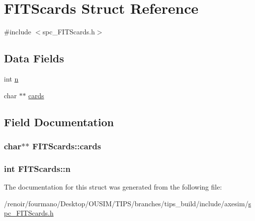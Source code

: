 \hypertarget{structFITScards}{
\section{FITScards Struct Reference}
\label{structFITScards}
}


{\ttfamily \#include $<$spc\_\-FITScards.h$>$}\subsection*{Data Fields}
\begin{DoxyCompactItemize}
\item 
int \hyperlink{structFITScards_ae541232523495d8487f2d47d2ad71873}{n}
\item 
char $\ast$$\ast$ \hyperlink{structFITScards_ad1be9be894e41dec8131959f119b387c}{cards}
\end{DoxyCompactItemize}


\subsection{Field Documentation}
\hypertarget{structFITScards_ad1be9be894e41dec8131959f119b387c}{
\subsubsection[{cards}]{\setlength{\rightskip}{0pt plus 5cm}char$\ast$$\ast$ {\bf FITScards::cards}}}
\label{structFITScards_ad1be9be894e41dec8131959f119b387c}
\hypertarget{structFITScards_ae541232523495d8487f2d47d2ad71873}{
\subsubsection[{n}]{\setlength{\rightskip}{0pt plus 5cm}int {\bf FITScards::n}}}
\label{structFITScards_ae541232523495d8487f2d47d2ad71873}


The documentation for this struct was generated from the following file:\begin{DoxyCompactItemize}
\item 
/renoir/fourmano/Desktop/OUSIM/TIPS/branches/tips\_\-build/include/axesim/\hyperlink{spc__FITScards_8h}{spc\_\-FITScards.h}\end{DoxyCompactItemize}
